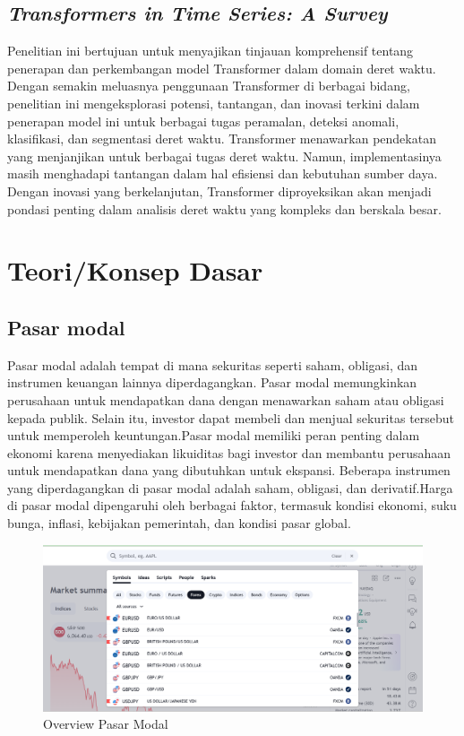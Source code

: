 \subsection{\textit{Transformers in Time Series: A Survey}}
Penelitian ini bertujuan untuk menyajikan tinjauan komprehensif tentang penerapan dan perkembangan model Transformer dalam domain deret waktu. Dengan semakin meluasnya penggunaan Transformer di berbagai bidang, penelitian ini mengeksplorasi potensi, tantangan, dan inovasi terkini dalam penerapan model ini untuk berbagai tugas peramalan, deteksi anomali, klasifikasi, dan segmentasi deret waktu. Transformer menawarkan pendekatan yang menjanjikan untuk berbagai tugas deret waktu. Namun, implementasinya masih menghadapi tantangan dalam hal efisiensi dan kebutuhan sumber daya. Dengan inovasi yang berkelanjutan, Transformer diproyeksikan akan menjadi pondasi penting dalam analisis deret waktu yang kompleks dan berskala besar.

\section{Teori/Konsep Dasar}

\subsection{Pasar modal}

Pasar modal adalah tempat di mana sekuritas seperti saham, obligasi, dan instrumen keuangan lainnya diperdagangkan. Pasar modal memungkinkan perusahaan untuk mendapatkan dana dengan menawarkan saham atau obligasi kepada publik. Selain itu, investor dapat membeli dan menjual sekuritas tersebut untuk memperoleh keuntungan.Pasar modal memiliki peran penting dalam ekonomi karena menyediakan likuiditas bagi investor dan membantu perusahaan untuk mendapatkan dana yang dibutuhkan untuk ekspansi\autocite{mishkin2018financial}. Beberapa instrumen yang diperdagangkan di pasar modal adalah saham, obligasi, dan derivatif.Harga di pasar modal dipengaruhi oleh berbagai faktor, termasuk kondisi ekonomi, suku bunga, inflasi, kebijakan pemerintah, dan kondisi pasar global.
\begin{figure} [H] \centering
  \includegraphics[scale=0.4]{gambar/gambarpasarmodalbeneran.png} 
    \caption{Overview Pasar Modal}
    \label{fig:label_gambar}
\end{figure}

